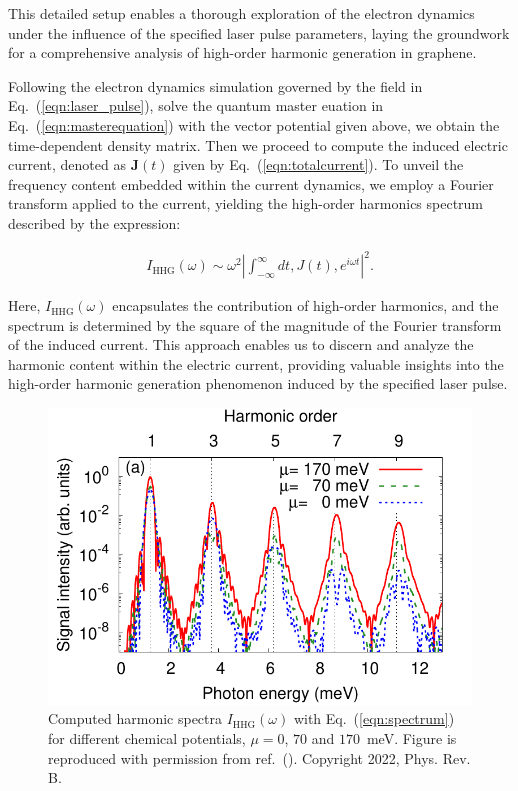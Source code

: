 This detailed setup enables a thorough exploration of the electron dynamics under the influence of the specified laser pulse parameters, laying the groundwork for a comprehensive analysis of high-order harmonic generation in graphene.

Following the electron dynamics simulation governed by the field in Eq.~(\ref{eqn:laser_pulse}), solve the quantum master euation in Eq.~(\ref{eqn:masterequation}) with the vector potential given above, we obtain the time-dependent density matrix. Then we proceed to compute the induced electric current, denoted as $\mathbf J(t)$ given by Eq.~(\ref{eqn:totalcurrent}). To unveil the frequency content embedded within the current dynamics, we employ a Fourier transform applied to the current, yielding the high-order harmonics spectrum described by the expression:

\begin{align}
	I_{\mathrm{HHG}}(\omega)\sim \omega^2 \left | \int^{\infty}_{-\infty} dt , J(t) , e^{i\omega t} \right |^2.
	\label{eqn:spectrum}
\end{align}

Here, $I_{\mathrm{HHG}}(\omega)$ encapsulates the contribution of high-order harmonics, and the spectrum is determined by the square of the magnitude of the Fourier transform of the induced current. This approach enables us to discern and analyze the harmonic content within the electric current, providing valuable insights into the high-order harmonic generation phenomenon induced by the specified laser pulse.

\begin{figure}[htbp]
	\centering
	\includegraphics[width=0.8\linewidth]{pic/hhg_mu.pdf}
	\caption{\label{fig:hhg_mu}
		Computed harmonic spectra $I_{\mathrm{HHG}}(\omega)$ with Eq.~(\ref{eqn:spectrum}) for different
		chemical potentials, $\mu = 0$, $70$ and $170$~meV. Figure is reproduced with permission from ref.~(\cite{PhysRevB.106.024313}). Copyright 2022, Phys. Rev. B.}
\end{figure}

